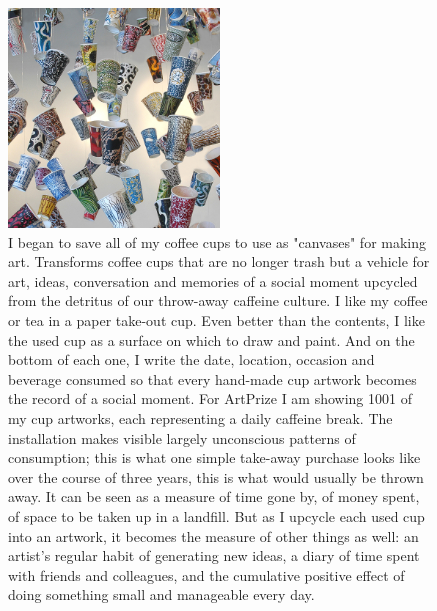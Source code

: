   \begin{figure}[h!]
      \centering
      \includegraphics[width=0.5\textwidth]{graphics/Gwyneth-Leech-cup5.jpg}
      \caption[Gwyneth Leech, 365 A Year in Cups, 2013, Mixed media on upcycled paper coffee cups, Dimensions Variable]{I began to save all of my coffee cups to use as "canvases" for making art. Transforms coffee cups that are no longer trash but a vehicle for art, ideas, conversation and memories of a social moment upcycled from the detritus of our throw-away caffeine culture. I like my coffee or tea in a paper take-out cup. Even better than the contents, I like the used cup as a surface on which to draw and paint. And on the bottom of each one, I write the date, location, occasion and beverage consumed so that every hand-made cup artwork becomes the record of a social moment. For ArtPrize I am showing 1001 of my cup artworks, each representing a daily caffeine break. The installation makes visible largely unconscious patterns of consumption; this is what one simple take-away purchase looks like over the course of three years, this is what would usually be thrown away. It can be seen as a measure of time gone by, of money spent, of space to be taken up in a landfill. But as I upcycle each used cup into an artwork, it becomes the measure of other things as well: an artist's regular habit of generating new ideas, a diary of time spent with friends and colleagues, and the cumulative positive effect of doing something small and manageable every day.}
      \label{fig:GwynethLeech_TheCup}
  \end{figure}

